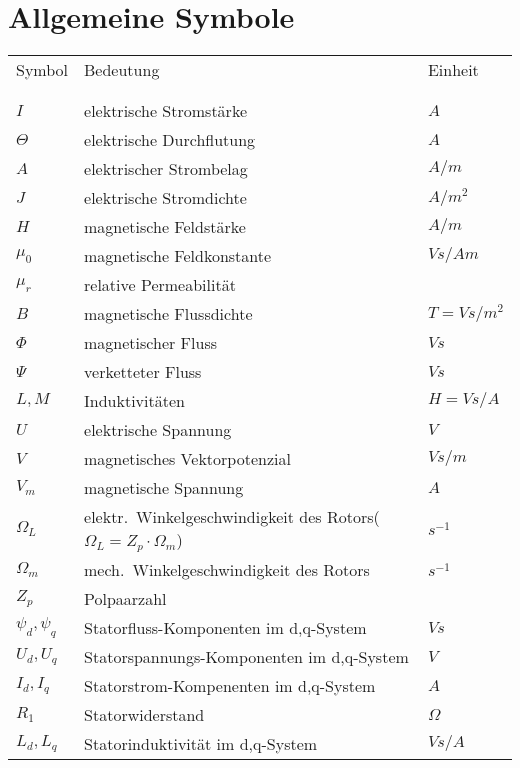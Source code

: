 \section*{Allgemeine Symbole}\label{s.sym.alg}
\begin{flushleft}\begin{tabularx}{\textwidth}{l l X}
Symbol & Bedeutung	& Einheit\\
\\
\hline
\\ 
$I$	& elektrische Stromstärke	&	$A$ \\
$\Theta$	&	elektrische Durchflutung 	&	$A$	\\
$A$			&	elektrischer Strombelag  	&  	$A/m$\\ 
$J$			&	elektrische Stromdichte		&	$A/m^2$ \\	
$H$			&	magnetische Feldstärke		&	$A/m$\\
$\mu_0$		&	magnetische Feldkonstante	&	$Vs/Am$\\
$\mu_r$		&	relative Permeabilität		&	\\
$B$			&	magnetische Flussdichte		&	$T = Vs/m^2$ \\
$\Phi$		&	magnetischer Fluss			&	$Vs$ \\
$\Psi$		&	verketteter Fluss			&	$Vs$ \\
$L, M$		&	Induktivitäten				&	$H = Vs/A$\\
$U$			&	elektrische Spannung		&	$V$ \\
$V$			&	magnetisches Vektorpotenzial&	$Vs/m$\\
$V_m$		&	magnetische Spannung		&	$A$ \\
$\Omega_L$	&	elektr.\ Winkelgeschwindigkeit des Rotors($\Omega_L = Z_p\cdot \Omega_m$) & $s^{-1}$ \\
$\Omega_m$	&	mech.\ Winkelgeschwindigkeit des Rotors & $s^{-1}$ \\
$Z_p$		&	Polpaarzahl					&	\\
$\psi_d, \psi_q$	&	Statorfluss-Komponenten im d,q-System &	$Vs$ \\
$U_d, U_q$	&	Statorspannungs-Komponenten im d,q-System &	$V$ \\
$I_d, I_q$	&	Statorstrom-Kompenenten im d,q-System	&	$A$ \\
$R_1$		&	Statorwiderstand			&	$\Omega$ \\
$L_d, L_q$	& 	Statorinduktivität im d,q-System & $Vs/A$
\end{tabularx}\end{flushleft}
